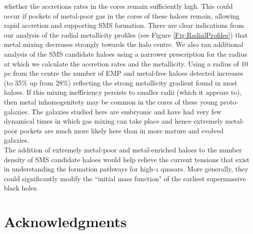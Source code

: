 \documentclass[graphics, twocolumn, usenatbib]{mn2e}
\begin{document}
whether the accretions rates in the cores remain sufficiently high.  This could occur if pockets
of metal-poor gas in the cores of these haloes remain, allowing rapid accretion and supporting SMS
formation. There are clear indications from our analysis of the radial metallicity profiles
(see Figure \ref{Fig:RadialProfiles}) that metal mixing decreases strongly towards the halo centre.
We also ran additional analysis of the SMS candidate haloes using a narrower prescription for the
radius at which we calculate the accretion rates and the metallicity. Using a radius of 10 pc
from the centre the number of EMP and metal-free haloes detected increases (to 35\% up from 28\%)
reflecting the strong metallicity gradient found in most haloes. 
If this mixing inefficiency persists to smaller radii (which it appears to),
then metal inhomogenitety may be common in the cores of these young proto-galaxies. The galaxies studied here are
embryonic and have had very few dynamical times in which 
gas mixing can take place and hence extremely metal-poor pockets are much more likely here than in more mature and evolved galaxies.\\
\indent  The addition of extremely metal-poor and metal-enriched haloes to the number density of SMS
candidate haloes would help relieve the current tensions that exist in understanding the formation pathways for high-$z$ quasars. More generally, they could significantly modify the ``initial mass function" of the earliest supermassive black holes.

\section*{Acknowledgments}
\end{document}
